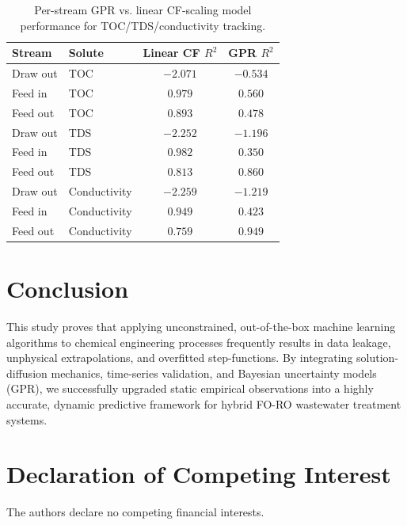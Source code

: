 \documentclass[journal, onecolumn, 12pt]{IEEEtran}
\begin{document}
\begin{table}[htbp]
\centering
\caption{Per-stream GPR vs. linear CF-scaling model performance for TOC/TDS/conductivity tracking.}
\label{tab:model3}
\begin{tabular}{llcc}
\toprule
Stream & Solute & Linear CF $R^2$ & GPR $R^2$ \\
\midrule
Draw out & TOC & $-2.071$ & $-0.534$ \\
Feed in & TOC & $0.979$ & $0.560$ \\
Feed out & TOC & $0.893$ & $0.478$ \\
Draw out & TDS & $-2.252$ & $-1.196$ \\
Feed in & TDS & $0.982$ & $0.350$ \\
Feed out & TDS & $0.813$ & $0.860$ \\
Draw out & Conductivity & $-2.259$ & $-1.219$ \\
Feed in & Conductivity & $0.949$ & $0.423$ \\
Feed out & Conductivity & $0.759$ & $0.949$ \\
\bottomrule
\end{tabular}
\end{table}

\section{Conclusion}
This study proves that applying unconstrained, out-of-the-box machine learning algorithms to chemical engineering processes frequently results in data leakage, unphysical extrapolations, and overfitted step-functions. By integrating solution-diffusion mechanics, time-series validation, and Bayesian uncertainty models (GPR), we successfully upgraded static empirical observations into a highly accurate, dynamic predictive framework for hybrid FO-RO wastewater treatment systems.

\section*{Declaration of Competing Interest}
The authors declare no competing financial interests.
\end{document}
